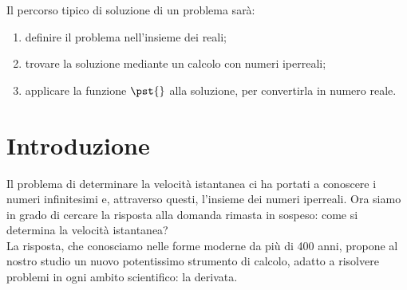 % 
% 
Il percorso tipico di soluzione di un problema sarà: 
\begin{enumerate}
\item definire il problema nell'insieme dei reali;
\item trovare la soluzione mediante un calcolo con numeri iperreali;
\item applicare la funzione \(\pst{}\) alla soluzione, per convertirla in 
numero reale.
\end{enumerate}

\section{Introduzione}
\label{sec:differenziazione_introduzione}
Il problema di determinare la velocità istantanea ci ha portati a conoscere 
i numeri infinitesimi e, attraverso questi, l'insieme dei numeri iperreali.
Ora siamo in grado di cercare la risposta alla domanda rimasta in sospeso: 
come si determina la velocità istantanea?\\
La risposta, che conosciamo nelle forme moderne da più di 400 anni,
propone al nostro studio un nuovo potentissimo strumento di calcolo, 
adatto a risolvere problemi in ogni ambito scientifico: la derivata.

